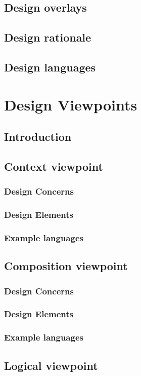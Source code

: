 \documentclass[onecolumn, draftclsnofoot,10pt, compsoc]{IEEEtran}
\begin{document}
\begin{singlespace}
	\subsection{Design overlays}
	\subsection{Design rationale}
	\subsection{Design languages}
\section{Design Viewpoints}
	\subsection{Introduction}
	\subsection{Context viewpoint}
		\subsubsection{Design Concerns}
		\subsubsection{Design Elements}
		\subsubsection{Example languages}
	\subsection{Composition viewpoint}
		\subsubsection{Design Concerns}
		\subsubsection{Design Elements}
		\subsubsection{Example languages}
	\subsection{Logical viewpoint}

\end{singlespace}
\end{document}
